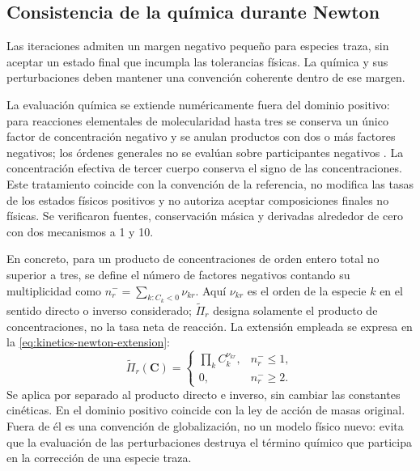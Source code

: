 \documentclass[12pt,a4paper,twoside,openany]{book}
\newcommand{\vect}[1]{\bm{#1}}
\begin{document}
\subsection{Consistencia de la química durante Newton}
\label{sec:kinetics-newton-treatment}

Las iteraciones admiten un margen negativo pequeño para especies traza, sin
aceptar un estado final que incumpla las tolerancias físicas. La química y sus
perturbaciones deben mantener una convención coherente dentro de ese margen.

La evaluación química se extiende numéricamente fuera del dominio positivo:
para reacciones elementales de molecularidad hasta tres se conserva un único
factor de concentración negativo y se anulan productos con dos o más factores
negativos; los órdenes generales no se evalúan sobre participantes negativos
\cite{CanteraSource32}.
La concentración efectiva de tercer cuerpo conserva el signo de las
concentraciones. Este tratamiento coincide con la convención de la referencia,
no modifica las tasas de los estados físicos positivos y no autoriza aceptar
composiciones finales no físicas. Se verificaron fuentes, conservación másica
y derivadas alrededor de cero con dos mecanismos a 1 y
\SI{10}{\atmosphere}.

En concreto, para un producto de concentraciones de orden entero total no
superior a tres, se define el número de factores negativos contando su
multiplicidad como \(n_r^-=\sum_{k:C_k<0}\nu_{kr}\).
Aquí \(\nu_{kr}\) es el orden de la especie \(k\) en el sentido directo o
inverso considerado; \(\widetilde\Pi_r\) designa solamente el producto de
concentraciones, no la tasa neta de reacción. La extensión empleada se expresa
en la \cref{eq:kinetics-newton-extension}:
\begin{equation}
  \widetilde\Pi_r(\vect C)=
  \begin{cases}
    \displaystyle\prod_k C_k^{\nu_{kr}}, & n_r^-\leq 1,\\
    0, & n_r^-\geq 2.
  \end{cases}
  \label{eq:kinetics-newton-extension}
\end{equation}
Se aplica por separado al producto directo e inverso, sin cambiar las
constantes cinéticas. En el dominio positivo coincide con la ley de acción
de masas original. Fuera de él es una convención de globalización, no un
modelo físico nuevo: evita que la evaluación de las perturbaciones destruya
el término químico que participa en la corrección de una especie traza.
\end{document}
